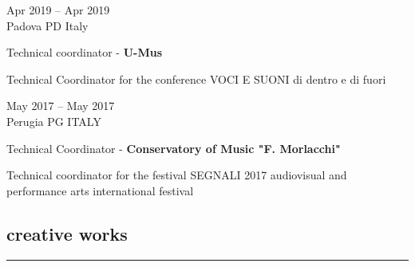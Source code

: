 \documentclass[7pt,a4paper]{article}
\begin{document}
\begin{mdframed}[
    backgroundcolor=white,
    linecolor=white,
    linewidth=0pt,
    innerleftmargin=6pt,
    innerrightmargin=6pt,
    innertopmargin=6pt,
    innerbottommargin=6pt,
    skipabove=0pt,
    skipbelow=0pt
]

\begin{minipage}[t]{0.28\textwidth}

Apr 2019 – Apr 2019
\\\scriptsize Padova PD Italy

\end{minipage}
\begin{minipage}[t]{0.68\textwidth}
Technical coordinator - \textbf{U-Mus}

\par \scriptsize Technical Coordinator for the conference VOCI E SUONI di dentro e di fuori

\vspace{0.25cm}
\end{minipage}
\end{mdframed}


\begin{mdframed}[
    backgroundcolor=entrygray,
    linecolor=entrygray,
    linewidth=0pt,
    innerleftmargin=6pt,
    innerrightmargin=6pt,
    innertopmargin=6pt,
    innerbottommargin=6pt,
    skipabove=0pt,
    skipbelow=0pt
]

\begin{minipage}[t]{0.28\textwidth}

May 2017 – May 2017
\\\scriptsize Perugia PG ITALY

\end{minipage}
\begin{minipage}[t]{0.68\textwidth}
Technical Coordinator - \textbf{Conservatory of Music "F. Morlacchi"}

\par \scriptsize Technical coordinator for the festival SEGNALI 2017 audiovisual and performance arts international festival

\vspace{0.25cm}
\end{minipage}
\end{mdframed}


\subsection*{creative works}
\normalsize
\vspace{-0.5cm}
\rule{\textwidth}{0.4pt}
\vspace{0.1cm}
\end{document}

